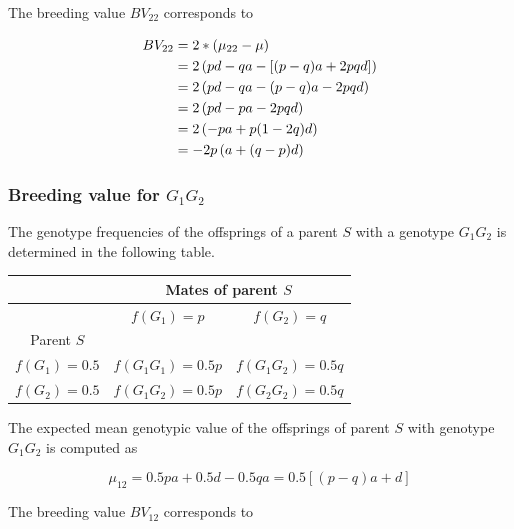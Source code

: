 \documentclass[
]{book}
\theoremstyle{definition}
\theoremstyle{definition}
\theoremstyle{definition}
\theoremstyle{remark}
\begin{document}
The breeding value \(BV_{22}\) corresponds to

\begin{align}
BV_{22} &=   2*(\mu_{22} - \mu)  \notag \\
        &=   2\left(pd - qa - \left[(p - q)a + 2pqd \right] \right) \notag \\
        &=   2\left(pd - qa - (p - q)a - 2pqd \right) \notag \\
        &=   2\left(pd - pa - 2pqd\right) \notag \\
        &=   2\left(-pa + p(1-2q)d\right) \notag \\
        &=  -2p\left(a + (q - p)d\right)
\label{eq:BVGen22}
\end{align}

\hypertarget{breeding-value-for-g_1g_2}{%
\subsubsection{\texorpdfstring{Breeding value for \(G_1G_2\)}{Breeding value for G\_1G\_2}}\label{breeding-value-for-g_1g_2}}

The genotype frequencies of the offsprings of a parent \(S\) with a genotype \(G_1G_2\) is determined in the following table.

\vspace{5ex}

\begin{tabular}{|c|c|c|}
\hline
& \multicolumn{2}{|c|}{Mates of parent $S$} \\
\hline
& $f(G_1) = p$       &  $f(G_2) = q$   \\
\hline
Parent $S$       &                    &                 \\
\hline
$f(G_1) = 0.5$ &  $f(G_1G_1) = 0.5p$   &  $f(G_1G_2) = 0.5q$\\
\hline
$f(G_2) = 0.5$ &  $f(G_1G_2) = 0.5p$   &  $f(G_2G_2) = 0.5q$\\
\hline
\end{tabular}

\vspace{5ex}

The expected mean genotypic value of the offsprings of parent \(S\) with genotype \(G_1G_2\) is computed as

\begin{equation}
\mu_{12} = 0.5pa + 0.5d - 0.5qa = 0.5\left[(p-q)a + d \right]
\label{eq:MeanOffGen12}
\end{equation}

The breeding value \(BV_{12}\) corresponds to
\end{document}
